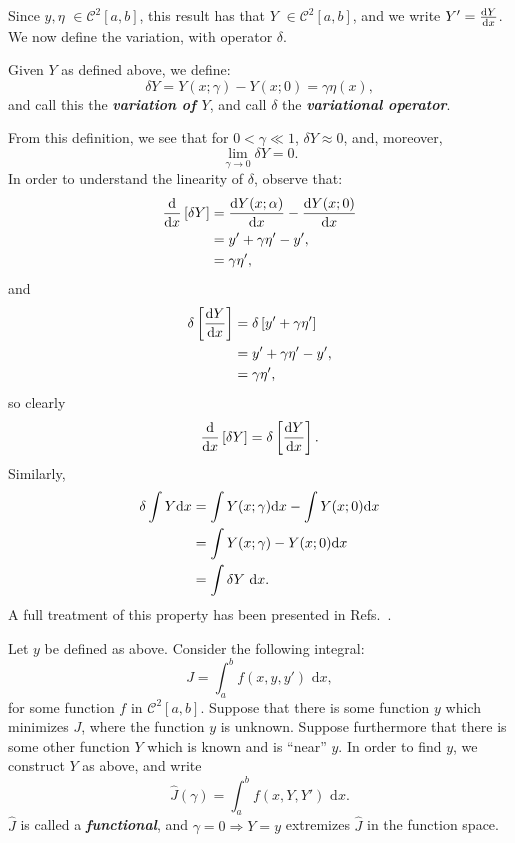 Since $y,\eta$ $\in\mathcal C^2[a,b]$, this result has that $Y$ $\in\mathcal C^2[a,b]$, and we write $Y' = \frac{\text dY}{\text dx}$.\newline
We now define the variation, with operator $\delta$.
\begin{definition} 
Given $Y$ as defined above, we define:
\begin{equation}
\delta Y = Y(x;\gamma)-Y(x;0) = \gamma\eta(x),
\end{equation}
and call this the \emph{\textbf{variation of $Y$}}, and call $\delta$ the \emph{\textbf{variational operator}}.
\end{definition}
From this definition, we see that for $0<\gamma\ll 1$, $\delta Y \approx 0$, and, moreover, 
\begin{equation}
\lim_{\gamma\to 0}{\delta Y}=0.
\end{equation}
In order to understand the linearity of $\delta$, observe that:
\begin{align}
\frac{\text d}{\text dx}\left[\delta Y\right] &= \frac{\text dY(x;\alpha)}{\text dx}-\frac{\text dY(x;0)}{\text dx}\\
                                 &= y'+\gamma\eta' - y',\\
                                 &= \gamma\eta',
\end{align}
and
\begin{align}
\delta\left[\frac{\text dY}{\text dx}\right] &= \delta\left[y'+\gamma\eta'\right]\\
                                 &= y'+\gamma\eta' - y',\\
                                 &= \gamma\eta',
\end{align}
so clearly
\begin{equation}
\frac{\text d}{\text dx}\left[\delta Y\right] = \delta\left[\frac{\text dY}{\text dx}\right].
\end{equation}
Similarly,
\begin{align}
\delta\int{Y}\text dx &= \int{Y(x;\gamma)}\text dx-\int{Y(x;0)}\text dx\\
					  &= \int{Y(x;\gamma)-Y(x;0)}\text dx\\
					  &= \int{\delta Y}\text{ d}x.
\end{align}
A full treatment of this property has been presented in Refs.~\cite{cornelius1970variational,weinstock1974calculus}.
\begin{definition}
Let $y$ be defined as above. Consider the following integral:
\begin{equation}
J = \int_a^b{f(x,y,y')}\text{ d}x,
\end{equation}
for some function $f$ in $\mathcal C^2[a,b]$. Suppose that there is some function $y$ which minimizes $J$, where the function $y$ is unknown. Suppose furthermore that there is some other function $Y$ which is known and is ``near'' $y$. In order to find $y$, we construct $Y$ as above, and write
\begin{equation}
\hat J(\gamma) = \int_a^b{f(x,Y,Y')}\text{ d}x.
\end{equation}
$\hat J$ is called a \emph{\textbf{functional}}, and $\gamma=0\Rightarrow Y=y$ extremizes $\hat J$ in the function space. 
\end{definition}
